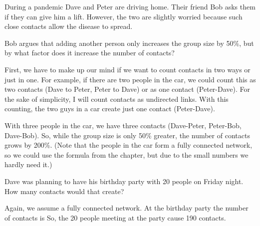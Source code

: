

During a pandemic Dave and Peter are driving home. Their friend Bob asks them if they can give him a lift. However, the two are slightly worried because such close contacts allow the disease to spread.

\subquestion
Bob argues that adding another person only increases the group size by 50\%, but by what factor does it increase the number of contacts?

\solution
First, we have to make up our mind if we want to count contacts in two ways or just in one. For example, if there are two people in the car, we could count this as two contacts (Dave to Peter, Peter to Dave) or as one contact (Peter-Dave). For the sake of simplicity, I will count contacts as undirected links. With this counting, the two guys in a car create just one contact (Peter-Dave).
    
With three people in the car, we have three contacts (Dave-Peter, Peter-Bob, Dave-Bob). So, while the group size is only 50\% greater, the number of contacts grows by 200\%. (Note that the people in the car form a fully connected network, so we could use the formula from the chapter, but due to the small numbers we hardly need it.)

\subquestion
Dave was planning to have his birthday party with 20 people on Friday night. How many contacts would that create?

\solution
Again, we assume a fully connected network. At the birthday party the number of contacts is 
So, the 20 people meeting at the party cause 190 contacts.



